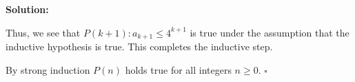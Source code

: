 \documentclass{article}
\newenvironment{solution}
{
\par
\color{blue}
\textbf{Solution:}
}
{
\par
}
\begin{document}
\begin{enumerate}
\begin{solution}
Thus, we see that $P(k + 1): a_{k+1} \leq 4^{k+1}$ is true under the assumption that the inductive hypothesis is true. This completes the inductive step.

By strong induction $P(n)$ holds true for all integers $n \geq 0$. $\square$
\end{solution}

\end{enumerate}
\end{document}
